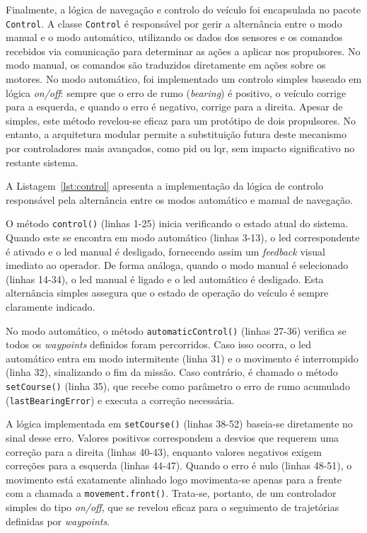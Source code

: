 Finalmente, a lógica de navegação e controlo do veículo foi encapsulada no pacote \texttt{Control}. A classe \texttt{Control} é responsável por gerir a alternância entre o modo manual e o modo automático, utilizando os dados dos sensores e os comandos recebidos via comunicação para determinar as ações a aplicar nos propulsores. No modo manual, os comandos são traduzidos diretamente em ações sobre os motores. No modo automático, foi implementado um controlo simples baseado em lógica \emph{on/off}: sempre que o erro de rumo (\emph{bearing}) é positivo, o veículo corrige para a esquerda, e quando o erro é negativo, corrige para a direita. Apesar de simples, este método revelou-se eficaz para um protótipo de dois propulsores. No entanto, a arquitetura modular permite a substituição futura deste mecanismo por controladores mais avançados, como \acrfull{pid} ou \acrfull{lqr}, sem impacto significativo no restante sistema.  

A Listagem~\ref{lst:control} apresenta a implementação da lógica de controlo responsável pela alternância entre os modos automático e manual de navegação. 



O método \texttt{control()} (linhas 1-25) inicia verificando o estado atual do sistema. Quando este se encontra em modo automático (linhas 3-13), o \gls{led} correspondente é ativado e o \gls{led} manual é desligado, fornecendo assim um \emph{feedback} visual imediato ao operador. De forma análoga, quando o modo manual é selecionado (linhas 14-34), o \gls{led} manual é ligado e o \gls{led} automático é desligado. Esta alternância simples assegura que o estado de operação do veículo é sempre claramente indicado.  

No modo automático, o método \texttt{automaticControl()} (linhas 27-36) verifica se todos os \emph{waypoints} definidos foram percorridos. Caso isso ocorra, o \gls{led} automático entra em modo intermitente (linha 31) e o movimento é interrompido (linha 32), sinalizando o fim da missão. Caso contrário, é chamado o método \texttt{setCourse()} (linha 35), que recebe como parâmetro o erro de rumo acumulado (\texttt{lastBearingError}) e executa a correção necessária.  

A lógica implementada em \texttt{setCourse()} (linhas 38-52) baseia-se diretamente no sinal desse erro. Valores positivos correspondem a desvios que requerem uma correção para a direita (linhas 40-43), enquanto valores negativos exigem correções para a esquerda (linhas 44-47). Quando o erro é nulo (linhas 48-51), o movimento está exatamente alinhado logo movimenta-se apenas para a frente com a chamada a \texttt{movement.front()}. Trata-se, portanto, de um controlador simples do tipo \emph{on/off}, que se revelou eficaz para o seguimento de trajetórias definidas por \emph{waypoints}.  

